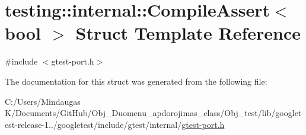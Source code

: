 \hypertarget{structtesting_1_1internal_1_1_compile_assert}{}\section{testing\+::internal\+::Compile\+Assert$<$ bool $>$ Struct Template Reference}
\label{structtesting_1_1internal_1_1_compile_assert}


{\ttfamily \#include $<$gtest-\/port.\+h$>$}



The documentation for this struct was generated from the following file\+:\begin{DoxyCompactItemize}
\item 
C\+:/\+Users/\+Mindaugas K/\+Documents/\+Git\+Hub/\+Obj\+\_\+\+Duomenu\+\_\+apdorojimas\+\_\+class/\+Obj\+\_\+test/lib/googletest-\/release-\/1../googletest/include/gtest/internal/\mbox{\hyperlink{_obj__test_2lib_2googletest-release-1_88_81_2googletest_2include_2gtest_2internal_2gtest-port_8h}{gtest-\/port.\+h}}\end{DoxyCompactItemize}
